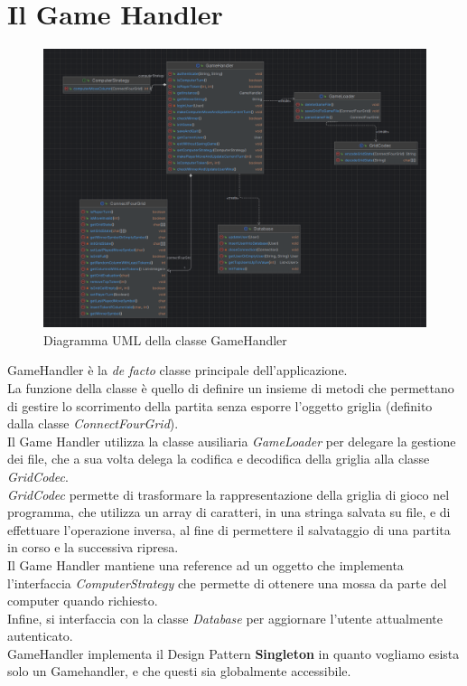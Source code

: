 
\thispagestyle{headings}
\newpage
\section{Il Game Handler}\label{sec:game-handler}

\begin{figure}
    \centering
    \includegraphics[scale=0.4]{img/gamehandler-uml}
    \caption{Diagramma UML della classe GameHandler}
    \label{fig:gamehandler-uml}
\end{figure}

GameHandler è la \textit{de facto} classe principale dell'applicazione. \\
La funzione della classe è quello di definire un insieme di metodi che permettano di gestire lo scorrimento della
partita senza esporre l'oggetto griglia (definito dalla classe \textit{ConnectFourGrid}). \\
Il Game Handler utilizza la classe ausiliaria \textit{GameLoader} per delegare la gestione dei file,
che a sua volta delega la codifica e decodifica della griglia alla classe \textit{GridCodec}. \\
\textit{GridCodec} permette di trasformare la rappresentazione della griglia di gioco nel programma, che utilizza
un array di caratteri, in una stringa salvata su file, e di effettuare l'operazione inversa, al fine di permettere
il salvataggio di una partita in corso e la successiva ripresa. \\
Il Game Handler mantiene una reference ad un oggetto che implementa l'interfaccia \textit{ComputerStrategy} che
permette di ottenere una mossa da parte del computer quando richiesto. \\
Infine, si interfaccia con la classe \textit{Database} per aggiornare l'utente attualmente autenticato. \\
GameHandler implementa il Design Pattern \textbf{Singleton}\cite{GoF} in quanto vogliamo esista solo un Gamehandler, e che questi
sia globalmente accessibile. \\

